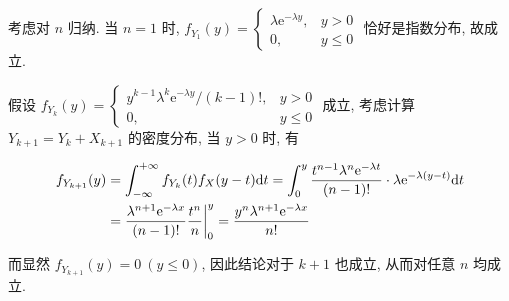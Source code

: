 \documentclass[8pt]{article}
\theoremstyle{compact}
\def\le{\leqslant}
\def\e{\mathrm{e}}
\begin{document}
\section{}
\label{t7}
考虑对 $n$ 归纳. 当 $n = 1$ 时, $f_{Y_1}(y) = \begin{cases}
	\lambda\e^{-\lambda y}, & y > 0\\
	0, & y \le 0
\end{cases}$ 恰好是指数分布, 故成立.

假设 $f_{Y_k}(y) = \begin{cases}
	y^{k-1}\lambda^k\e^{-\lambda y} / (k-1)!, & y > 0\\
	0, & y \le 0
\end{cases}$ 成立, 考虑计算$Y_{k+1} = Y_k + X_{k+1}$ 的密度分布, 当 $y > 0$ 时, 有

\begin{equation}
	\begin{split}
		f_{Y_{k+1}}(y) &= \int_{-\infty}^{+\infty}f_{Y_k}(t)f_{X}(y-t)\text dt = \int_{0}^{y}\frac{t^{n-1}\lambda^n\e^{-\lambda t}}{(n-1)!}\cdot \lambda \e^{-\lambda(y-t)}\text dt\\
		&= \frac{\lambda^{n+1}\e^{-\lambda x}}{(n-1)!} \frac{t^n}{n}\bigg|_{0}^{y} = \frac{y^n\lambda^{n+1}\e^{-\lambda x}}{n!}
	\end{split}
\end{equation}

而显然 $f_{Y_{k + 1}}(y) = 0 \ (y \le 0)$, 因此结论对于 $k+1$ 也成立, 从而对任意 $n$ 均成立.

\section{}

\subsection{}
\end{document}

